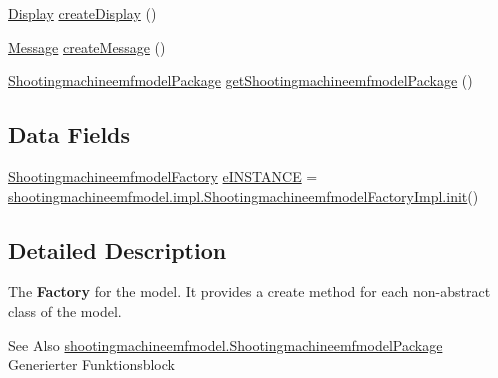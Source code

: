 \begin{DoxyCompactItemize}
\item 
\hyperlink{interfaceshootingmachineemfmodel_1_1_display}{Display} \hyperlink{interfaceshootingmachineemfmodel_1_1_shootingmachineemfmodel_factory_aa412f37f244b3485ff6e5e3f3614f3f9}{create\-Display} ()
\item 
\hyperlink{interfaceshootingmachineemfmodel_1_1_message}{Message} \hyperlink{interfaceshootingmachineemfmodel_1_1_shootingmachineemfmodel_factory_a0780370460a602478a704c8330d80bf8}{create\-Message} ()
\item 
\hyperlink{interfaceshootingmachineemfmodel_1_1_shootingmachineemfmodel_package}{Shootingmachineemfmodel\-Package} \hyperlink{interfaceshootingmachineemfmodel_1_1_shootingmachineemfmodel_factory_a908ed8a192f1bd69ae8204381e765966}{get\-Shootingmachineemfmodel\-Package} ()
\end{DoxyCompactItemize}
\subsection*{Data Fields}
\begin{DoxyCompactItemize}
\item 
\hyperlink{interfaceshootingmachineemfmodel_1_1_shootingmachineemfmodel_factory}{Shootingmachineemfmodel\-Factory} \hyperlink{interfaceshootingmachineemfmodel_1_1_shootingmachineemfmodel_factory_a000cd4598703f054fa910e19bf287f87}{e\-I\-N\-S\-T\-A\-N\-C\-E} = \hyperlink{classshootingmachineemfmodel_1_1impl_1_1_shootingmachineemfmodel_factory_impl_ad0841c6b6e65880d7b7bcbb789a25bd0}{shootingmachineemfmodel.\-impl.\-Shootingmachineemfmodel\-Factory\-Impl.\-init}()
\end{DoxyCompactItemize}


\subsection{Detailed Description}
The {\bfseries Factory} for the model. It provides a create method for each non-\/abstract class of the model.

\begin{DoxySeeAlso}{See Also}
\hyperlink{interfaceshootingmachineemfmodel_1_1_shootingmachineemfmodel_package}{shootingmachineemfmodel.\-Shootingmachineemfmodel\-Package} Generierter Funktionsblock 
\end{DoxySeeAlso}


